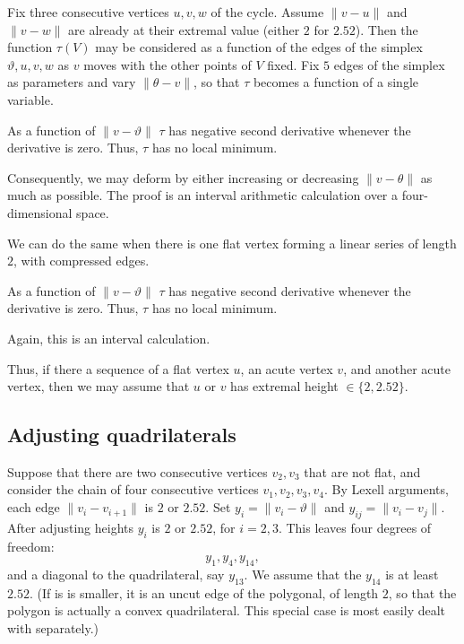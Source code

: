 Fix three consecutive vertices $u,v,w$ of the cycle.
Assume $\|v-u\|$ and $\|v-w\|$ are already at their extremal value (either $2$ for  $2.52$).  Then the function $\tau(V)$ may be considered as a function
of the edges of the simplex $\vartheta,u,v,w$ as $v$ moves with the other points of $V$ fixed.  Fix $5$ edges of the simplex as parameters and vary $\|\theta-v\|$, so that $\tau$ becomes a function of a single variable.

\begin{lemma} As a function of $\|v-\vartheta\|$
 $\tau$ has negative second derivative whenever the derivative is zero.  Thus, $\tau$ has no local minimum.
\end{lemma}

Consequently, we may deform by either increasing or decreasing $\|v-\theta\|$ as much as possible.  The proof is an interval arithmetic calculation over a four-dimensional space.


We can do the same when there is one flat vertex forming a linear series of length $2$, with compressed edges.

\begin{lemma}
As a function of $\|v-\vartheta\|$
 $\tau$ has negative second derivative whenever the derivative is zero.  Thus, $\tau$ has no local minimum.
\end{lemma}

Again, this is an interval calculation.

Thus, if there a sequence of a flat vertex $u$, an acute vertex $v$, and another acute vertex, then we may assume that $u$ or $v$ has extremal height $\in\{2,2.52\}$.



\subsection{Adjusting quadrilaterals}

Suppose that there are two consecutive vertices $v_2,v_3$ that are not flat,
and consider the chain of four consecutive vertices $v_1,v_2,v_3,v_4$.
By Lexell arguments, each edge $\|v_i-v_{i+1}\|$ is $2$ or $2.52$.
Set $y_i = \|v_i-\vartheta\|$ and $y_{ij} = \|v_i-v_j\|$.
After adjusting heights $y_i$ is $2$ or $2.52$, for $i=2,3$.
This leaves four degrees of freedom:
$$
y_1,y_4,y_{14},
$$
and a diagonal to the quadrilateral, say $y_{13}$.
We assume that the $y_{14}$ is at least $2.52$.  (If is is smaller, it is an uncut edge of the polygonal, of length $2$, so that the polygon is actually a convex quadrilateral.  This special case is most easily dealt with separately.)


